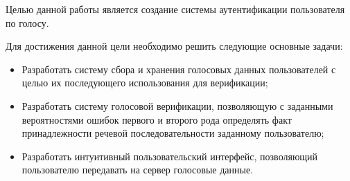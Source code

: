 \Intro


Целью данной работы является создание системы аутентификации пользователя по голосу.

Для достижения данной цели необходимо решить следующие основные задачи:

\begin{itemize}
\item Разработать систему сбора и хранения голосовых данных пользователей с целью их последующего использования для верификации;
\item Разработать систему голосовой верификации, позволяющую с заданными вероятностями ошибок первого и второго рода определять факт принадлежности речевой последовательности заданному пользователю;
\item Разработать интуитивный пользовательский интерфейс, позволяющий пользователю передавать на сервер голосовые данные.
\end{itemize}
